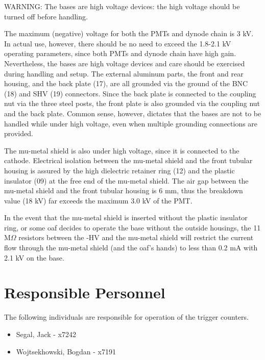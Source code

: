 \begin{safetyen}{10}{10}
  WARNING: The bases are high voltage devices: the high voltage should be
  turned off before handling.
  
  The maximum (negative) voltage for both the PMTs and dynode chain is 3 kV. In actual 
  use, however, there should be no need to exceed the 1.8-2.1 kV operating 
  parameters, since both PMTs and dynode chain have high gain. Nevertheless, the 
  bases are high voltage devices and care should be exercised during handling and 
  setup. The external aluminum parts, the front and rear housing, and the back 
  plate (17), are all grounded via the ground of the BNC (18) and SHV (19) 
  connectors. Since the back plate is connected to the coupling nut via the three 
  steel posts, the front plate is also grounded via the coupling nut and the back 
  plate. Common sense, however, dictates that the bases are not to be handled     
  while under high voltage, even when multiple grounding connections are provided.
  
  The mu-metal shield is also under high voltage, since it is connected to the 
  cathode. Electrical isolation between the mu-metal shield and the front 
  tubular housing is assured by the high dielectric retainer ring (12) and the 
  plastic insulator (09) at the free end of the mu-metal shield. The air gap 
  between the mu-metal shield and the front tubular housing is 6 mm, thus the 
  breakdown value (18 kV) far exceeds the maximum 3.0 kV of the PMT.
  
  In the event that the mu-metal shield is inserted without the plastic insulator 
  ring, or some oaf decides to operate the base without the outside housings, the 
  11 M$\Omega$ resistors between the -HV and the mu-metal shield will restrict the 
  current flow through the mu-metal shield (and the oaf's hands) to less than 0.2 
  mA with 2.1 kV on the base. 
\end{safetyen}

\section{Responsible Personnel} 
The following individuals are responsible for operation of the trigger counters. 
\begin{itemize}
\item[~]Segal, Jack - x7242 
\item[~]Wojtsekhowski, Bogdan - x7191 
\end{itemize} 

